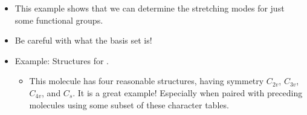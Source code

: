 \documentclass[../notes.tex]{subfiles}
\begin{document}
\begin{itemize}
\begin{figure}[h!]
        \label{fig:ML3CO3}
    \end{figure}
    \begin{enumerate}
        \item Determine the number, symmetries, and IR activities of the carbonyl stretching modes for the two isomers of an octahedral  complex.
        \begin{itemize}
            \item Since we are asked to determine the \emph{carbonyl stretching} modes, we choose as our basis set the three vectors which run parallel to the  bonds in both cases.
            \item The point group of the \emph{mer} isomer is $C_{2v}$; the point group of the \emph{fac} isomer is $C_{3v}$.
            \item With this information, the rest of the question is fairly straightforward.
        \end{itemize}
        \item The IR spectrum of the compound  exhibits bands at \qtylist{1993;1919;1890}{\per\centi\meter}. The IR spectrum of compound  exhibits bands at \qtylist{1942;1860}{\per\centi\meter}. Based on your answer from part (1), how would you assign the \emph{fac} vs. \emph{mer} structure of these two complexes?
        \begin{itemize}
            \item From part (1), determine which structure gave rise to three nondegenerate stretching modes, and which gave rise to two.
        \end{itemize}
    \end{enumerate}
    \item This example shows that we can determine the stretching modes for just some functional groups.
    \item Be careful with what the basis set is!
    \item Example: Structures for .
    \begin{itemize}
        \item This molecule has four reasonable structures, having symmetry $C_{2v}$, $C_{3v}$, $C_{4v}$, and $C_s$. It is a great example! Especially when paired with preceding molecules using some subset of these character tables.
    \end{itemize}
\end{itemize}
\end{document}
